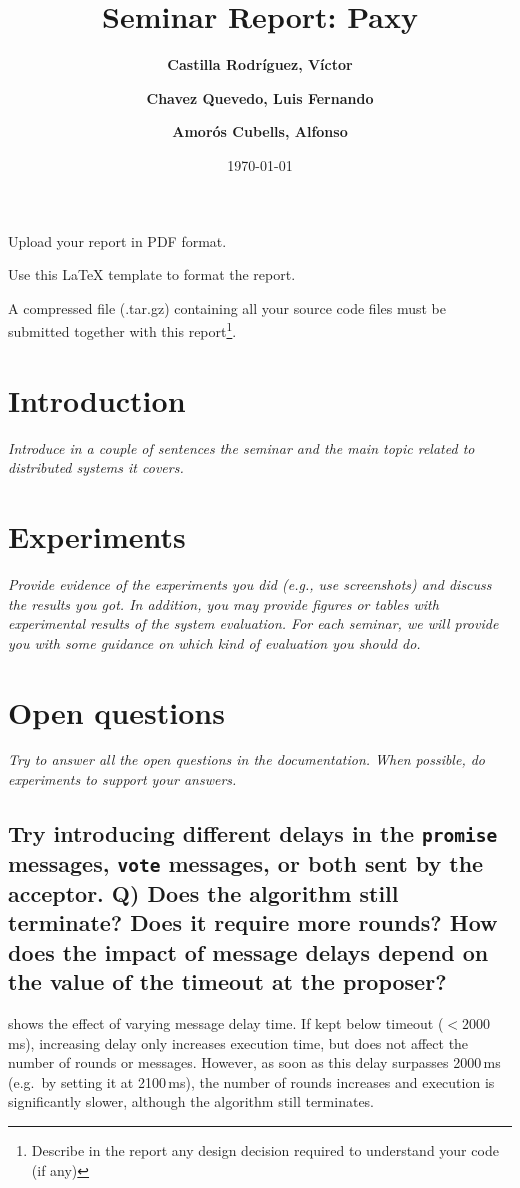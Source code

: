 \documentclass[a4paper, 10pt]{article}
\title{Seminar Report: Paxy}
\author{ \textbf{Castilla Rodríguez, Víctor} \and \textbf{Chavez Quevedo, Luis Fernando} \and \textbf{Amorós Cubells, Alfonso}
}
\date{\normalsize\today{}}
\begin{document}
\maketitle

\begin{center}
  Upload your report in PDF format.

  Use this LaTeX template to format the report.

	A compressed file (.tar.gz) containing all your source code files must be submitted together with this report\footnote{Describe in the report any design decision required to understand your code (if any)}.
\end{center}

\section{Introduction}

\textit{Introduce in a couple of sentences the seminar and the main topic related to distributed systems it covers.}

\section{Experiments}

\textit{Provide evidence of the experiments you did (e.g., use screenshots) and discuss the results you got. In addition, you may provide figures or tables with experimental results of the system evaluation. For each seminar, we will provide you with some guidance on which kind of evaluation you should do.}

\section{Open questions}

\textit{Try to answer all the open questions in the documentation. When possible, do experiments to support your answers.}

\subsection{\!Try introducing different delays in the
\texttt{promise} messages, \texttt{vote} messages, or both sent by the acceptor. Q) Does the
algorithm still terminate? Does it require more rounds? How does the impact
of message delays depend on the value of the timeout at the proposer?}

 shows the effect of varying message delay time.
If kept below timeout (\(< 2000\)\,ms), increasing delay only increases execution time, but does not affect the number of rounds
or messages.
However, as soon as this delay surpasses 2000\,ms (e.g.~by setting it at 2100\,ms), the number of rounds increases and execution is significantly slower, although the algorithm still terminates.
\end{document}

